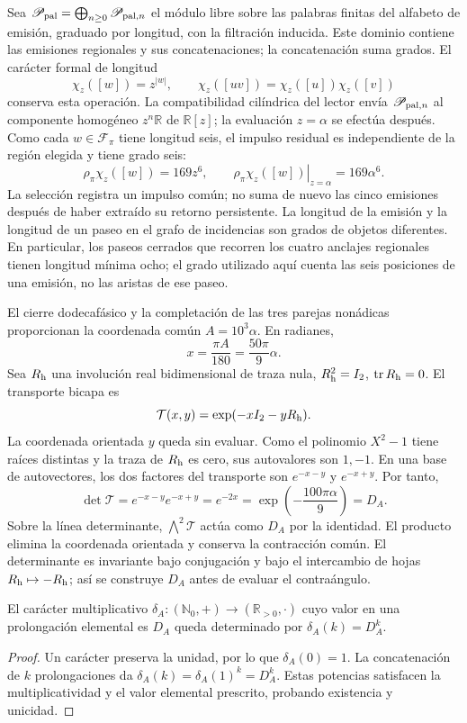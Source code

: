 Sea \(\mathscr P_{\rm pal}=\bigoplus_{n\ge0}\mathscr P_{{\rm pal},n}\) el módulo libre
sobre las palabras finitas del alfabeto de emisión, graduado por longitud,
con la filtración inducida. Este dominio contiene las emisiones regionales
y sus concatenaciones; la concatenación suma grados. El carácter
formal de longitud
\[
 \chi_z([w])=z^{|w|},\qquad
 \chi_z([uv])=\chi_z([u])\chi_z([v])
\]
conserva esta operación. La compatibilidad cilíndrica del lector envía
\(\mathscr P_{{\rm pal},n}\) al componente homogéneo \(z^n\mathbb R\) de
\(\mathbb R[z]\); la evaluación \(z=\alpha\) se efectúa después.
Como cada \(w\in\mathcal F_\pi\) tiene longitud seis, el impulso
residual es independiente de la región elegida y tiene grado seis:
\[
 \rho_\pi\chi_z([w])=169z^6,
 \qquad\left.\rho_\pi\chi_z([w])\right|_{z=\alpha}=169\alpha^6.
\]
La selección registra un impulso común; no suma de nuevo las cinco
emisiones después de haber extraído su retorno persistente.
La longitud de la emisión y la longitud de un paseo en el grafo de
incidencias son grados de objetos diferentes. En particular, los paseos
cerrados que recorren los cuatro anclajes regionales tienen longitud
mínima ocho; el grado utilizado aquí cuenta las seis posiciones de una
emisión, no las aristas de ese paseo.

El cierre dodecafásico y la completación de las tres parejas nonádicas
proporcionan la coordenada común \(A=10^3\alpha\). En radianes,
\[
 x=\frac{\pi A}{180}=\frac{50\pi}{9}\alpha.
\]
Sea \(R_{\rm h}\) una involución real bidimensional de traza nula,
\(R_{\rm h}^2=I_2\), \(\operatorname{tr}R_{\rm h}=0\). El transporte bicapa es
\[
 \mathcal T(x,y)=\exp(-xI_2-yR_{\rm h}).
\]
La coordenada orientada \(y\) queda sin evaluar. Como el polinomio
\(X^2-1\) tiene raíces distintas y la traza de \(R_{\rm h}\) es cero,
sus autovalores son \(1,-1\). En una base de autovectores, los dos
factores del transporte son \(e^{-x-y}\) y \(e^{-x+y}\). Por tanto,
\[
 \det\mathcal T=e^{-x-y}e^{-x+y}=e^{-2x}
 =\exp\!\left(-\frac{100\pi\alpha}{9}\right)=D_A.
\]
Sobre la línea determinante, \(\bigwedge^2\mathcal T\) actúa como
\(D_A\) por la identidad. El producto elimina la coordenada orientada y conserva la contracción
común. El determinante es invariante bajo conjugación y bajo el
intercambio de hojas \(R_{\rm h}\mapsto-R_{\rm h}\); así se construye \(D_A\)
antes de evaluar el contraángulo.

\begin{proposition}
\label{prop:accion-caracter-determinantal}
El carácter multiplicativo \(\delta_A:(\mathbb N_0,+)\to(\mathbb R_{>0},\cdot)\)
cuyo valor en una prolongación elemental es \(D_A\) queda determinado
por \(\delta_A(k)=D_A^k\).
\end{proposition}
\begin{proof}
Un carácter preserva la unidad, por lo que \(\delta_A(0)=1\).
La concatenación de \(k\) prolongaciones da
\(\delta_A(k)=\delta_A(1)^k=D_A^k\). Estas potencias satisfacen
la multiplicatividad y el valor elemental prescrito, probando existencia
y unicidad.
\end{proof}

